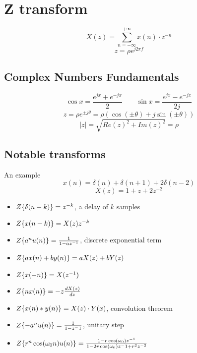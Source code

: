 
\section{Z transform}
\begin{LARGE}
    $$
    X(z)=\sum_{n=-\infty}^{+\infty}x(n)\cdot z^{-n}
    $$
    $$
    z=\rho e^{j2\pi f}
    $$ 
\end{LARGE}

\subsection{Complex Numbers Fundamentals}
\begin{LARGE}
    $$
    \cos x=\frac{
        e^{jx}+e^{-jx}
    }{2}\qquad
    \sin x=\frac{
        e^{jx}-e^{-jx}
    }{2j}
    $$
    $$
    z=\rho e^{\pm j\theta}=\rho(\cos(\pm\theta)+j\sin(\pm\theta))
    $$
    $$
    |z|=\sqrt{Re(z)^2+Im(z)^2}=\rho
    $$
\end{LARGE}


\subsection{Notable transforms}
An example
$$x(n)=\delta(n)+\delta(n+1)+2\delta(n-2)$$
$$X(z)=1+z+2z^{-2}$$
\begin{itemize}
    \item $Z\{{\delta(n-k)}\}=z^{-k}$, a delay of $k$ samples
    \item $Z\{{x(n-k)}\}=X(z)z^{-k}$
    \item $Z\{{a^nu(n)}\}=\frac{1}{1-az^{-1}}$, discrete exponential term
    \item $Z\{{ax(n)+by(n)}\}=aX(z)+bY(z)$
    \item $Z\{{x(-n)}\}=X(z^{-1})$
    \item $Z\{{nx(n)}\}=-z\frac{dX(z)}{dz}$
    \item $Z\{{x(n)*y(n)}\}=X(z)\cdot Y(x)$, convolution theorem
    \item $Z\{{-a^nu(n)}\}=\frac{1}{1-z^-1}$, unitary step
    \item $Z\{{r^n\cos(\omega_0n)u(n)}\}=\frac{1-r\cos(\omega_0)z^{-1}}{1-2r\cos(\omega_0)z^-1+r^2z^{-2}}$
\end{itemize}

